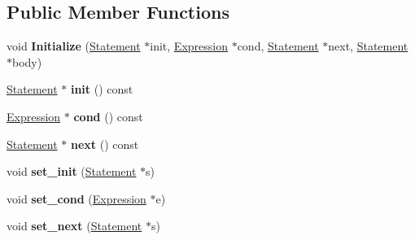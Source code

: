 \subsection*{Public Member Functions}
\begin{DoxyCompactItemize}
\item 
void {\bfseries Initialize} (\hyperlink{classv8_1_1internal_1_1_statement}{Statement} $\ast$init, \hyperlink{classv8_1_1internal_1_1_expression}{Expression} $\ast$cond, \hyperlink{classv8_1_1internal_1_1_statement}{Statement} $\ast$next, \hyperlink{classv8_1_1internal_1_1_statement}{Statement} $\ast$body)\hypertarget{classv8_1_1internal_1_1_for_statement_a45ed0c83852f2640c761dd6d66cdf42c}{}\label{classv8_1_1internal_1_1_for_statement_a45ed0c83852f2640c761dd6d66cdf42c}

\item 
\hyperlink{classv8_1_1internal_1_1_statement}{Statement} $\ast$ {\bfseries init} () const \hypertarget{classv8_1_1internal_1_1_for_statement_ad1841b71394ca68963b70581d039ba69}{}\label{classv8_1_1internal_1_1_for_statement_ad1841b71394ca68963b70581d039ba69}

\item 
\hyperlink{classv8_1_1internal_1_1_expression}{Expression} $\ast$ {\bfseries cond} () const \hypertarget{classv8_1_1internal_1_1_for_statement_a4ee34cbe9bbdb67e504d479778b28709}{}\label{classv8_1_1internal_1_1_for_statement_a4ee34cbe9bbdb67e504d479778b28709}

\item 
\hyperlink{classv8_1_1internal_1_1_statement}{Statement} $\ast$ {\bfseries next} () const \hypertarget{classv8_1_1internal_1_1_for_statement_a0e942035aa05482b6d80a679f12020c7}{}\label{classv8_1_1internal_1_1_for_statement_a0e942035aa05482b6d80a679f12020c7}

\item 
void {\bfseries set\+\_\+init} (\hyperlink{classv8_1_1internal_1_1_statement}{Statement} $\ast$s)\hypertarget{classv8_1_1internal_1_1_for_statement_a99852c52a871af5ab66ee053832515f9}{}\label{classv8_1_1internal_1_1_for_statement_a99852c52a871af5ab66ee053832515f9}

\item 
void {\bfseries set\+\_\+cond} (\hyperlink{classv8_1_1internal_1_1_expression}{Expression} $\ast$e)\hypertarget{classv8_1_1internal_1_1_for_statement_aca510c50c626ee675b0c60a3ac69841c}{}\label{classv8_1_1internal_1_1_for_statement_aca510c50c626ee675b0c60a3ac69841c}

\item 
void {\bfseries set\+\_\+next} (\hyperlink{classv8_1_1internal_1_1_statement}{Statement} $\ast$s)\hypertarget{classv8_1_1internal_1_1_for_statement_a2064c6a58f435e7bd429eed4b2b47a08}{}\label{classv8_1_1internal_1_1_for_statement_a2064c6a58f435e7bd429eed4b2b47a08}


\end{DoxyCompactItemize}
